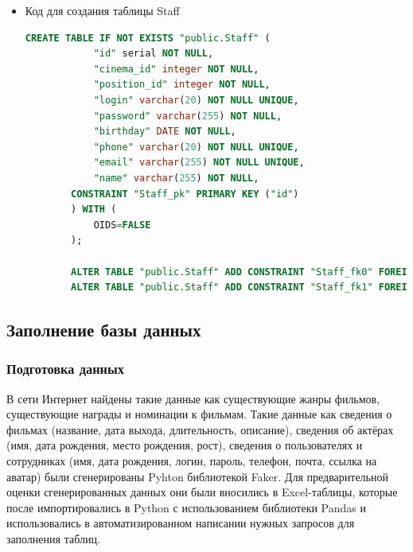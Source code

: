\documentclass[a4paper,12pt]{article}
\renewcommand{\^}[2]{#1^{\, #2} \kern -1pt}
\newcommand{\1}{\kern 1pt}
\newcommand{\0}{\kern -1pt}
\begin{document}
\begin{itemize}
	\begin{lstlisting}[style=vscode-dark, language=SQL, label={lst:sql18}]
		CREATE TABLE IF NOT EXISTS "public.Cinemas_positions" (
			"id" serial NOT NULL,
			"position" varchar(255) NOT NULL UNIQUE,
			CONSTRAINT "Cinemas_positions_pk" PRIMARY KEY ("id")
		) WITH (
			OIDS=FALSE
		);
	\end{lstlisting}
	
	\item Код для создания таблицы Staff
	
	\begin{lstlisting}[style=vscode-dark, language=SQL, label={lst:sql19}]
		CREATE TABLE IF NOT EXISTS "public.Staff" (
			"id" serial NOT NULL,
			"cinema_id" integer NOT NULL,
			"position_id" integer NOT NULL,
			"login" varchar(20) NOT NULL UNIQUE,
			"password" varchar(255) NOT NULL,
			"birthday" DATE NOT NULL,
			"phone" varchar(20) NOT NULL UNIQUE,
			"email" varchar(255) NOT NULL UNIQUE,
			"name" varchar(255) NOT NULL,
		CONSTRAINT "Staff_pk" PRIMARY KEY ("id")
		) WITH (
			OIDS=FALSE
		);
		
		ALTER TABLE "public.Staff" ADD CONSTRAINT "Staff_fk0" FOREIGN KEY ("cinema_id") REFERENCES "public.Cinemas"("id");
		ALTER TABLE "public.Staff" ADD CONSTRAINT "Staff_fk1" FOREIGN KEY ("position_id") REFERENCES "public.Cinemas_positions"("id");
	\end{lstlisting}

	\end{itemize}
		
		
	\newpage
	
	\subsection{Заполнение базы данных}\label{subsec:--}

	
	\subsubsection{Подготовка данных}
	
	В сети Интернет найдены такие данные как существующие жанры фильмов, существующие награды и номинации к фильмам. Такие данные как сведения о фильмах (название, дата выхода, длительность, описание), сведения об актёрах (имя, дата рождения, место рождения, рост), сведения о пользователях и сотрудниках (имя, дата рождения, логин, пароль, телефон, почта, ссылка на аватар) были сгенерированы Pyhton библиотекой Faker. Для предварительной оценки сгенерированных данных они были вносились в Excel-таблицы, которые после импортировались в Python с использованием библиотеки Pandas и использовались в автоматизированном написании нужных запросов для заполнения таблиц.
	
\end{document}
